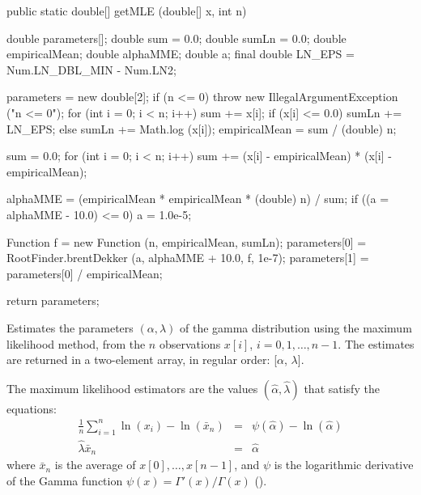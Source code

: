\begin{code}

   public static double[] getMLE (double[] x, int n)\begin{hide} {
      double parameters[];
      double sum = 0.0;
      double sumLn = 0.0;
      double empiricalMean;
      double alphaMME;
      double a;
      final double LN_EPS = Num.LN_DBL_MIN - Num.LN2;

      parameters = new double[2];
      if (n <= 0)
         throw new IllegalArgumentException ("n <= 0");
      for (int i = 0; i < n; i++)
      {
         sum += x[i];
         if (x[i] <= 0.0)
            sumLn += LN_EPS;
         else
            sumLn += Math.log (x[i]);
      }
      empiricalMean = sum / (double) n;

      sum = 0.0;
      for (int i = 0; i < n; i++) {
         sum += (x[i] - empiricalMean) * (x[i] - empiricalMean);
      }

      alphaMME = (empiricalMean * empiricalMean * (double) n) / sum;
      if ((a = alphaMME - 10.0) <= 0) {
         a = 1.0e-5;
      }

      Function f = new Function (n, empiricalMean, sumLn);
      parameters[0] = RootFinder.brentDekker (a, alphaMME + 10.0, f, 1e-7);
      parameters[1] = parameters[0] / empiricalMean;

      return parameters;
   }\end{hide}
\end{code}
\begin{tabb}
  Estimates the parameters $(\alpha,\lambda)$ of the gamma distribution
   using the maximum likelihood method, from the $n$ observations
   $x[i]$, $i = 0, 1,\ldots, n-1$. The estimates are returned in a two-element
    array, in regular order: [$\alpha$, $\lambda$].
   \begin{detailed}
   The maximum likelihood estimators are the values $(\hat\alpha , \hat\lambda)$
   that satisfy the equations:
   \begin{eqnarray*}
      \frac{1}{n} \sum_{i=1}^{n} \ln(x_i) - \ln(\bar{x}_n) & = &
       \psi(\hat{\alpha}) - \ln(\hat{\alpha})\\
      \hat{\lambda} \bar{x}_n & = & \hat{\alpha}
   \end{eqnarray*}
   where $\bar x_n$ is the average of $x[0],\dots,x[n-1]$, and
   $\psi$ is the logarithmic derivative of the Gamma function
   $\psi(x) = \Gamma'(x) / \Gamma(x)$ (\cite[page 361]{tJOH95a}).
   \end{detailed}
\end{tabb}
